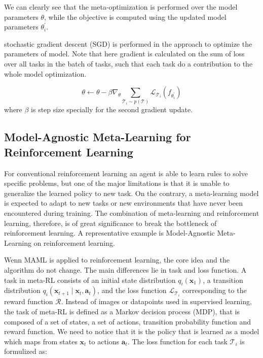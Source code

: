 We can clearly see that the meta-optimization is performed over the
model parameters $\theta$, while the objective is computed using the updated model parameters $\theta_{i}^{\prime}$.

stochastic gradient descent (SGD) is performed in the approach to optimize the parameters of model. Note that here gradient is calculated on the sum of loss over all tasks in the batch of tasks, such that each task do a contribution to the whole model optimization.

$$
\theta \leftarrow \theta-\beta \nabla_{\theta} \sum_{\mathcal{T}_{i} \sim p(\mathcal{T})} \mathcal{L}_{\mathcal{T}_{i}}\left(f_{\theta_{i}^{\prime}}\right)
$$
where $\beta$ is step size specially for the second gradient update.


\subsection{Model-Agnostic Meta-Learning for Reinforcement Learning}
For conventional reinforcement learning an agent is able to learn rules to solve specific problems, but one of the major limitations is that it is unable to generalize the learned policy to new task. On the contrary, a meta-learning model is expected to adapt to new tasks or new environments that have never been encountered during training. The combination of meta-learning and reinforcement learning, therefore, is of great significance to break the bottleneck of reinforcement learning. A representative example is Model-Agnostic Meta-Learning on reinforcement learning.

Wenn MAML is applied to reinforcement learning, the core idea and the algorithm do not change. The main differences lie in task and loss function. A task in meta-RL consists of  
 an initial state distribution $q_{i}\left(\mathbf{x}_{1}\right)$, a transition distribution $q_{i}\left(\mathbf{x}_{t+1} \mid \mathbf{x}_{t}, \mathbf{a}_{t}\right)$, and the loss function $\mathcal{L}_{\mathcal{T}_{i}}$ corresponding to the reward function $\mathcal{R}$. Instead of images or datapoints used in supervised learning, the task of meta-RL is defined as a Markov decision process (MDP), that is composed of a set of states, a set of actions, transition probability function and reward function. We need to notice that it is the policy that is learned as a model which maps from states $\mathbf{x}_{t}$ to actions $\mathbf{a}_{t}$. The loss function for each task ${\mathcal{T}_{i}}$
 is formulized as:
 
